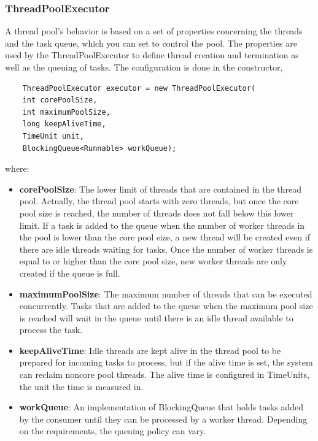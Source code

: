 \subsubsection{ThreadPoolExecutor}
A thread pool’s behavior is based on a set of properties concerning the threads and the task queue, which you can set to control the pool. The properties are used by the ThreadPoolExecutor to define thread creation and termination as well as the queuing of tasks. The configuration is done in the constructor,
\begin{lstlisting}
	ThreadPoolExecutor executor = new ThreadPoolExecutor(
	int corePoolSize,
	int maximumPoolSize,
	long keepAliveTime,
	TimeUnit unit,
	BlockingQueue<Runnable> workQueue);
\end{lstlisting}
where:
\begin{itemize}
	\item \textbf{corePoolSize}: The lower limit of threads that are contained in the thread pool. Actually, the thread pool starts with zero threads, but once the core pool size is reached, the number of threads does not fall below this lower limit. If a task is added to the queue when the number of worker threads in the pool is lower than the core pool size, a new thread will be created even if there are idle threads waiting for tasks. Once the number of worker threads is equal to or higher than the core pool size, new worker threads are only created if the queue is full.
	\item \textbf{maximumPoolSize}: The maximum number of threads that can be executed concurrently. Tasks that are added to the queue when the maximum pool size is reached will wait in the queue until there is an idle thread available to process the task.
	\item \textbf{keepAliveTime}: Idle threads are kept alive in the thread pool to be prepared for incoming tasks to process, but if the alive time is set, the system can reclaim noncore pool threads. The alive time is configured in TimeUnits, the unit the time is measured in.
	\item \textbf{workQueue}: An implementation of BlockingQueue that holds tasks added by the consumer until they can be processed by a worker thread. Depending on the requirements, the queuing policy can vary.
\end{itemize}

